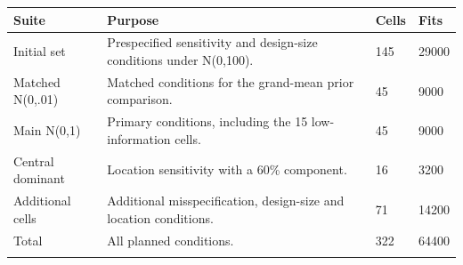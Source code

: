 \begin{longtable}{llll}
\toprule
Suite & Purpose & Cells & Fits \\
\midrule\endhead
Initial set & Prespecified sensitivity and design-size conditions under N(0,100). & 145 & 29000 \\ \addlinespace[3pt]
Matched N(0,.01) & Matched conditions for the grand-mean prior comparison. & 45 & 9000 \\ \addlinespace[3pt]
Main N(0,1) & Primary conditions, including the 15 low-information cells. & 45 & 9000 \\ \addlinespace[3pt]
Central dominant & Location sensitivity with a 60\% component. & 16 & 3200 \\ \addlinespace[3pt]
Additional cells & Additional misspecification, design-size and location conditions. & 71 & 14200 \\ \addlinespace[3pt]
Total & All planned conditions. & 322 & 64400 \\ \addlinespace[3pt]
\bottomrule\end{longtable}
